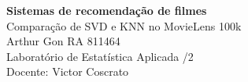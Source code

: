 \documentclass[11pt,a4paper]{article}
\begin{document}
\begin{center}
{\Large\bfseries Sistemas de recomendação de filmes}\\[0.3em]
Comparação de SVD e KNN no MovieLens 100k\\[0.6em]
Arthur Gon \quad RA 811464\\[0.15em]
Laboratório de Estatística Aplicada /2\\
Docente: Victor Coscrato
\end{center}


\clearpage

\clearpage

\clearpage


\end{document}
